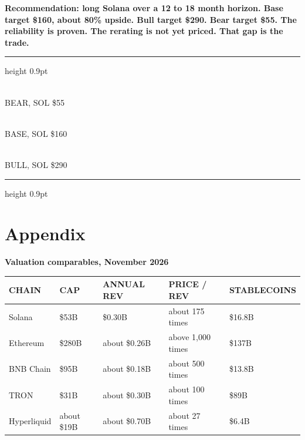 \documentclass[11pt]{article}
\begin{document}
\textbf{Recommendation: long Solana over a 12 to 18 month horizon. Base target \$160, about 80\% upside. Bull target \$290. Bear target \$55. The reliability is proven. The rerating is not yet priced. That gap is the trade.}

\vspace{14pt}
{\color{solpurple}\hrule height 0.9pt}
\vspace{10pt}
\noindent
\begin{minipage}[t]{0.31\linewidth}\\[3pt]{\scriptsize\sffamily\color{mid}\MakeUppercase{Bear, SOL \$55}}\end{minipage}\hfill
\begin{minipage}[t]{0.31\linewidth}\\[3pt]{\scriptsize\sffamily\color{mid}\MakeUppercase{Base, SOL \$160}}\end{minipage}\hfill
\begin{minipage}[t]{0.31\linewidth}\\[3pt]{\scriptsize\sffamily\color{mid}\MakeUppercase{Bull, SOL \$290}}\end{minipage}
\vspace{10pt}
{\color{solpurple}\hrule height 0.9pt}

\clearpage
\section*{Appendix}

{\small\sffamily\color{mid}\textbf{Valuation comparables, November 2026}}
\vspace{-2pt}

\begin{center}
\begin{tabular}{@{}lllll@{}}
\toprule
{\sffamily\footnotesize\color{mid}CHAIN} & {\sffamily\footnotesize\color{mid}CAP} & {\sffamily\footnotesize\color{mid}ANNUAL REV} & {\sffamily\footnotesize\color{mid}PRICE / REV} & {\sffamily\footnotesize\color{mid}STABLECOINS} \\
\midrule
Solana & \$53B & \$0.30B & about 175 times & \$16.8B \\
Ethereum & \$280B & about \$0.26B & above 1,000 times & \$137B \\
BNB Chain & \$95B & about \$0.18B & about 500 times & \$13.8B \\
TRON & \$31B & about \$0.30B & about 100 times & \$89B \\
Hyperliquid & about \$19B & about \$0.70B & about 27 times & \$6.4B \\
\bottomrule
\end{tabular}
\end{center}
\end{document}
